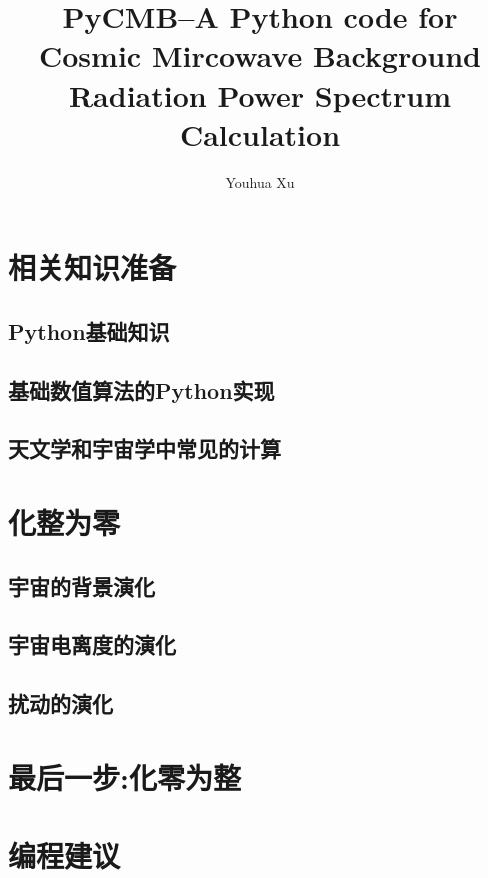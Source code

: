 \documentclass[a4paper,10pt]{ctexart}
\begin{document}
\title{PyCMB--A \textbf{P}ython code for \textbf{C}osmic \textbf{M}ircowave \textbf{B}ackground
Radiation Power Spectrum Calculation}
\author{Youhua Xu}
\maketitle


\tableofcontents


\section{相关知识准备}

\subsection{Python基础知识}

\subsection{基础数值算法的Python实现}

\subsection{天文学和宇宙学中常见的计算}


\section{化整为零}

\subsection{宇宙的背景演化}

\subsection{宇宙电离度的演化}

\subsection{扰动的演化}


\section{最后一步:化零为整}


\appendix
\section{编程建议}



\end{document}
